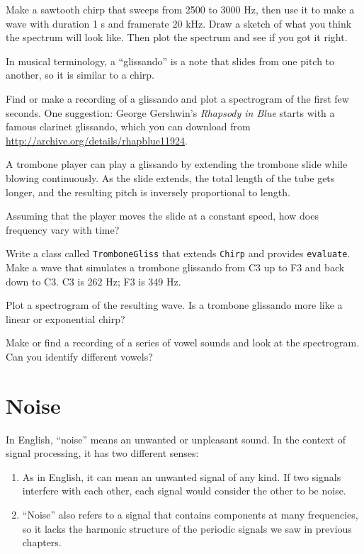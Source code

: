 \documentclass[12pt]{book}
\begin{document}
\begin{exercise}
Make a sawtooth chirp that sweeps from 2500 to 3000 Hz, then use it to
make a wave with duration 1 s and framerate 20 kHz.  Draw a sketch of
what you think the spectrum will look like.  Then plot the
spectrum and see if you got it right.
\end{exercise}


\begin{exercise}
In musical terminology, a ``glissando'' is a note that slides from one
pitch to another, so it is similar to a chirp.

Find or make a recording of a glissando and plot a spectrogram of the
first few seconds.  One suggestion: George Gershwin's {\it Rhapsody in
  Blue} starts with a famous clarinet glissando, which you can download
from \url{http://archive.org/details/rhapblue11924}.
\end{exercise}


\begin{exercise}
A trombone player can play a glissando by extending the trombone
slide while blowing continuously.  As the slide extends, the total
length of the tube gets longer, and the resulting pitch is inversely
proportional to length.

Assuming that the player moves the slide at a constant speed, how
does frequency vary with time?

Write a class called {\tt TromboneGliss} that extends {\tt Chirp} and
provides {\tt evaluate}.  Make a wave that simulates a trombone
glissando from C3 up to F3 and back down to C3.  C3 is 262 Hz; F3 is
349 Hz.

Plot a spectrogram of the resulting wave.  Is a trombone glissando
more like a linear or exponential chirp?
\end{exercise}


\begin{exercise}
Make or find a recording of a series of vowel sounds and look at the
spectrogram.  Can you identify different vowels?
\end{exercise}


\chapter{Noise}

In English, ``noise'' means an unwanted or unpleasant sound.  In the
context of signal processing, it has two different senses:

\begin{enumerate}

\item As in English, it can mean an unwanted signal of any kind.  If
two signals interfere with each other, each signal would consider
the other to be noise.

\item ``Noise'' also refers to a signal that contains components at
many frequencies, so it lacks the harmonic structure of the periodic
signals we saw in previous chapters.

\end{enumerate}
\end{document}
